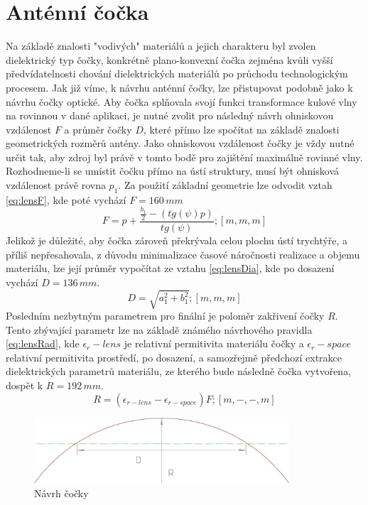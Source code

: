 \section{Anténní čočka}
Na základě znalosti "vodivých" materiálů a jejich charakteru byl zvolen dielektrický typ čočky, konkrétně plano-konvexní čočka zejména kvůli vyšší předvídatelnosti chování dielektrických materiálů po průchodu technologickým procesem.
Jak již víme, k návrhu anténní čočky, lze přistupovat podobně jako k návrhu čočky optické.
Aby čočka splňovala svojí funkci transformace kulové vlny na rovinnou v dané aplikaci, je nutné zvolit pro následný návrh ohniskovou vzdálenost $F$ a průměr čočky $D$, které přímo lze spočítat na základě znalosti geometrických rozměrů antény.
Jako ohniskovou vzdálenost čočky je vždy nutné určit tak, aby zdroj byl právě v tomto bodě pro zajištění maximálně rovinné vlny. Rozhodneme-li se umístit čočku přímo na ústí struktury, musí být ohnisková vzdálenost právě rovna $p_1$. Za použití základní geometrie lze odvodit vztah \ref{eq:lensF}, kde poté vychází $F = 160\,mm$
\begin{equation}
F = p + \frac{\frac{b_1}{2}-(tg(\psi) p) }{tg(\psi)} ; [m, m, m]
\label{eq:lensF}
\end{equation}
Jelikož je důležité, aby čočka zároveň překrývala celou plochu ústí trychtýře, a příliš nepřesahovala, z důvodu minimalizace časové náročnosti realizace a objemu materiálu, lze její průměr vypočítat ze vztahu \ref{eq:lensDia}, kde po dosazení vychází $D = 136\,mm$.
\begin{equation}
D = \sqrt{a_1^2+b_1^2} ; [m, m, m]
\label{eq:lensDia}
\end{equation}
Posledním nezbytným parametrem pro finální je poloměr zakřivení čočky $R$. Tento zbývající parametr lze na základě známého návrhového pravidla \ref{eq:lensRad}, kde $\epsilon_r-lens$ je relativní permitivita materiálu čočky a $\epsilon_r-space$ relativní permitivita prostředí, po dosazení, a samozřejmě předchozí extrakce dielektrických parametrů materiálu, ze kterého bude následně čočka vytvořena, dospět k $R = 192\,mm$.
\begin{equation}
R = (\epsilon_{r-lens} - \epsilon_{r-space})F ; [m, -, -, m]
\label{eq:lensRad}
\end{equation}

\begin{figure}[!htbp]
\begin{center}
\includegraphics[width=9.5cm]{pics/LensDesign}
\caption{Návrh čočky}
\label{fig:LensDesign}
\end{center}
\end{figure}

